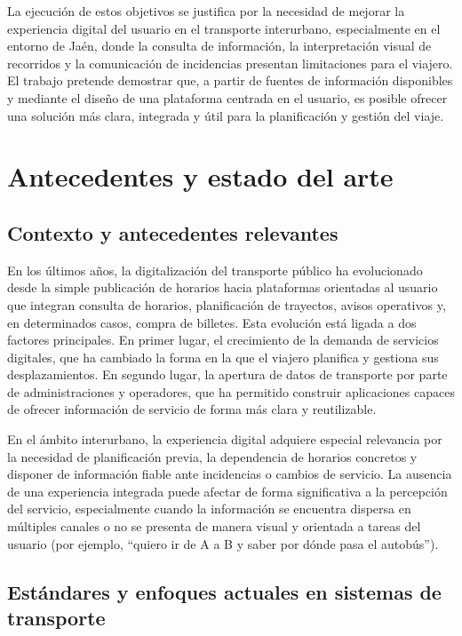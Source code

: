 La ejecución de estos objetivos se justifica por la necesidad de mejorar la experiencia digital del usuario en el transporte interurbano, especialmente en el entorno de Jaén, donde la consulta de información, la interpretación visual de recorridos y la comunicación de incidencias presentan limitaciones para el viajero. El trabajo pretende demostrar que, a partir de fuentes de información disponibles y mediante el diseño de una plataforma centrada en el usuario, es posible ofrecer una solución más clara, integrada y útil para la planificación y gestión del viaje.


\section{Antecedentes y estado del arte}
\label{sec:estado-arte}

\subsection{Contexto y antecedentes relevantes}

En los últimos años, la digitalización del transporte público ha evolucionado desde la simple publicación de horarios hacia plataformas orientadas al usuario que integran consulta de horarios, planificación de trayectos, avisos operativos y, en determinados casos, compra de billetes. Esta evolución está ligada a dos factores principales. En primer lugar, el crecimiento de la demanda de servicios digitales, que ha cambiado la forma en la que el viajero planifica y gestiona sus desplazamientos. En segundo lugar, la apertura de datos de transporte por parte de administraciones y operadores, que ha permitido construir aplicaciones capaces de ofrecer información de servicio de forma más clara y reutilizable.

En el ámbito interurbano, la experiencia digital adquiere especial relevancia por la necesidad de planificación previa, la dependencia de horarios concretos y disponer de información fiable ante incidencias o cambios de servicio. La ausencia de una experiencia integrada puede afectar de forma significativa a la percepción del servicio, especialmente cuando la información se encuentra dispersa en múltiples canales o no se presenta de manera visual y orientada a tareas del usuario (por ejemplo, ``quiero ir de A a B y saber por dónde pasa el autobús'').

\subsection{Estándares y enfoques actuales en sistemas de transporte}

